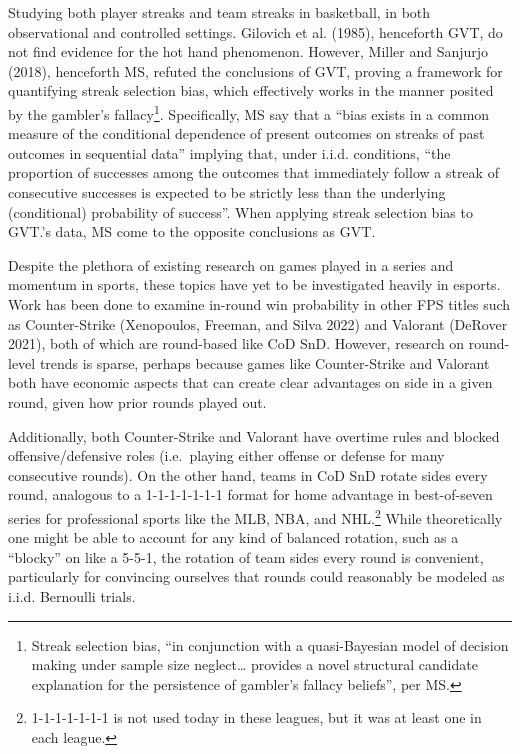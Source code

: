 \documentclass{article}
\begin{document}
Studying both player streaks and team streaks in basketball, in both
observational and controlled settings. Gilovich et al. (1985),
henceforth GVT, do not find evidence for the hot hand phenomenon.
However, Miller and Sanjurjo (2018), henceforth MS, refuted the
conclusions of GVT, proving a framework for quantifying streak selection
bias, which effectively works in the manner posited by the gambler's
fallacy\footnote{Streak selection bias, ``in conjunction with a
  quasi-Bayesian model of decision making under sample size
  neglect\ldots{} provides a novel structural candidate explanation for
  the persistence of gambler's fallacy beliefs'', per MS.}.
Specifically, MS say that a ``bias exists in a common measure of the
conditional dependence of present outcomes on streaks of past outcomes
in sequential data'' implying that, under i.i.d. conditions, ``the
proportion of successes among the outcomes that immediately follow a
streak of consecutive successes is expected to be strictly less than the
underlying (conditional) probability of success''. When applying streak
selection bias to GVT.'s data, MS come to the opposite conclusions as
GVT.

Despite the plethora of existing research on games played in a series
and momentum in sports, these topics have yet to be investigated heavily
in esports. Work has been done to examine in-round win probability in
other FPS titles such as Counter-Strike (Xenopoulos, Freeman, and Silva
2022) and Valorant (DeRover 2021), both of which are round-based like
CoD SnD. However, research on round-level trends is sparse, perhaps
because games like Counter-Strike and Valorant both have economic
aspects that can create clear advantages on side in a given round, given
how prior rounds played out.

Additionally, both Counter-Strike and Valorant have overtime rules and
blocked offensive/defensive roles (i.e.~playing either offense or
defense for many consecutive rounds). On the other hand, teams in CoD
SnD rotate sides every round, analogous to a 1-1-1-1-1-1-1 format for
home advantage in best-of-seven series for professional sports like the
MLB, NBA, and NHL.\footnote{1-1-1-1-1-1-1 is not used today in these
  leagues, but it was at least one in each league.} While theoretically
one might be able to account for any kind of balanced rotation, such as
a ``blocky'' on like a 5-5-1, the rotation of team sides every round is
convenient, particularly for convincing ourselves that rounds could
reasonably be modeled as i.i.d. Bernoulli trials.
\end{document}
